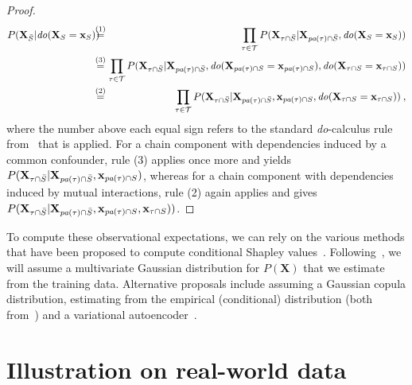 \documentclass{article}
\newcommand{\vX}{\mathbf{X}}
\newcommand{\vx}{\mathbf{x}}
\newcommand{\dodo}{\mathit{do}}
\newcommand{\lvdo}[1]{\dodo(\vX_{#1} = \vx_{#1})}
\newcommand{\spa}{\mathop{\textit{\scriptsize pa}}}
\newcommand{\chaincomponents}{{\cal T}}
\newcommand{\isequaldo}[1]{\hspace*{-2.5mm} & \overset{(#1)}{=} & \hspace*{-2.5mm}}
\begin{document}
\begin{proof}
\begin{eqnarray*}
	P(\vX_{\bar{S}}|\lvdo{S}) \isequaldo{1} \prod_{\tau \in \chaincomponents} P(\vX_{\tau \cap \bar{S}}|\vX_{\spa(\tau)  \cap \bar{S}},\lvdo{S}) \hfill \\
	\isequaldo{3}  \prod_{\tau \in \chaincomponents} P(\vX_{\tau \cap \bar{S}}|\vX_{\spa(\tau)  \cap \bar{S}},\lvdo{\spa(\tau) \cap S},\lvdo{\tau \cap S}) \\
	\isequaldo{2}  \prod_{\tau \in \chaincomponents} P(\vX_{\tau \cap \bar{S}}|\vX_{\spa(\tau)  \cap \bar{S}},\vx_{\spa(\tau) \cap S},\lvdo{\tau \cap S}) \: ,
\end{eqnarray*}
where the number above each equal sign refers to the standard \textit{do}-calculus rule from~\cite{pearl2012calculus} that is applied. For a chain component with dependencies induced by a common confounder, rule (3) applies once more and yields $P(\vX_{\tau \cap \bar{S}}|\vX_{\spa(\tau)  \cap \bar{S}},\vx_{\spa(\tau) \cap S})$,
whereas for a chain component with dependencies induced by mutual interactions, rule (2) again applies and gives $P(\vX_{\tau \cap \bar{S}}|\vX_{\spa(\tau)  \cap \bar{S}},\vx_{ \spa(\tau) \cap S},\vx_{\tau \cap S}))$.
\end{proof}

To compute these observational expectations, we can rely on the various methods that have been proposed to compute conditional Shapley values~\cite{aas2019explaining,frye2019asymmetric}. Following~\cite{aas2019explaining}, we will assume a multivariate Gaussian distribution for $P(\vX)$ that we estimate from the training data. Alternative proposals include assuming a Gaussian copula distribution, estimating from the empirical (conditional) distribution (both from~\cite{aas2019explaining}) and a variational autoencoder~\cite{frye2019asymmetric}.

\section{Illustration on real-world data}
\end{document}
